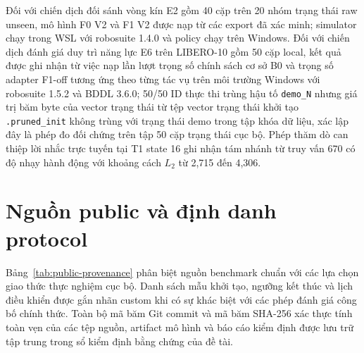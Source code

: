 Đối với chiến dịch đối sánh vòng kín E2 gồm 40 cặp trên 20 nhóm trạng thái raw unseen,
mô hình F0 V2 và F1 V2 được nạp từ các export đã xác minh; simulator chạy trong WSL
với robosuite 1.4.0 và policy chạy trên Windows. Đối với chiến dịch đánh giá duy trì
năng lực E6 trên LIBERO-10 gồm 50 cặp local, kết quả được ghi nhận từ việc nạp lần lượt
trọng số chính sách cơ sở B0 và trọng số adapter F1-off tương ứng theo từng tác vụ trên môi trường Windows với
robosuite 1.5.2 và BDDL 3.6.0; 50/50 ID thực thi trùng hậu tố \texttt{demo\_N} nhưng
giá trị băm byte của vector trạng thái từ tệp vector trạng thái khởi tạo \texttt{.pruned\_init} không trùng với trạng thái demo trong
tập khóa dữ liệu, xác lập đây là phép đo đối chứng trên tập 50 cặp trạng thái cục bộ. Phép thăm dò
can thiệp lời nhắc trực tuyến tại T1 state 16 ghi nhận tám nhánh từ truy vấn 670 có
độ nhạy hành động với khoảng cách $L_2$ từ 2,715 đến 4,306.

\section{Nguồn public và định danh protocol}

Bảng~\ref{tab:public-provenance} phân biệt nguồn benchmark chuẩn với các lựa chọn giao thức thực nghiệm cục bộ. Danh sách mẫu khởi tạo, ngưỡng kết thúc và lịch điều khiển được gắn nhãn custom khi có sự khác biệt với các phép đánh giá công bố chính thức. Toàn bộ mã băm Git commit và mã băm SHA-256 xác thực tính toàn vẹn của các tệp nguồn, artifact mô hình và báo cáo kiểm định được lưu trữ tập trung trong sổ kiểm định bằng chứng của đề tài.

